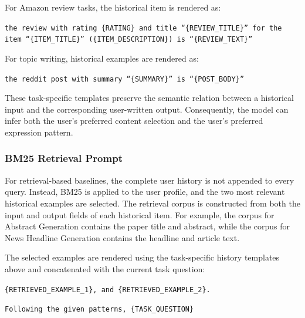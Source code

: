 \documentclass{article} %
\begin{document}
For Amazon review tasks, the historical item is rendered as:

\begin{tcolorbox}[
    colback=gray!5,
    colframe=black!45,
    title=Amazon-review history example,
    breakable,
    left=3pt,
    right=3pt,
    top=3pt,
    bottom=3pt
]
\small
\texttt{the review with rating \{RATING\} and title ``\{REVIEW\_TITLE\}'' for the item ``\{ITEM\_TITLE\}'' (\{ITEM\_DESCRIPTION\}) is ``\{REVIEW\_TEXT\}''}
\end{tcolorbox}

For topic writing, historical examples are rendered as:

\begin{tcolorbox}[
    colback=gray!5,
    colframe=black!45,
    title=Topic-writing history example,
    breakable,
    left=3pt,
    right=3pt,
    top=3pt,
    bottom=3pt
]
\small
\texttt{the reddit post with summary ``\{SUMMARY\}'' is ``\{POST\_BODY\}''}
\end{tcolorbox}

These task-specific templates preserve the semantic relation between a historical input and the corresponding user-written output. Consequently, the model can infer both the user's preferred content selection and the user's preferred expression pattern.

\subsubsection{BM25 Retrieval Prompt}

For retrieval-based baselines, the complete user history is not appended to every query. Instead, BM25 is applied to the user profile, and the two most relevant historical examples are selected. The retrieval corpus is constructed from both the input and output fields of each historical item. For example, the corpus for Abstract Generation contains the paper title and abstract, while the corpus for News Headline Generation contains the headline and article text.

The selected examples are rendered using the task-specific history templates above and concatenated with the current task question:

\begin{tcolorbox}[
    colback=gray!5,
    colframe=black!45,
    title=BM25 retrieval-conditioned prompt,
    breakable,
    left=3pt,
    right=3pt,
    top=3pt,
    bottom=3pt
]
\small
\texttt{\{RETRIEVED\_EXAMPLE\_1\}, and \{RETRIEVED\_EXAMPLE\_2\}.}

\texttt{Following the given patterns, \{TASK\_QUESTION\}}
\end{tcolorbox}
\end{document}
